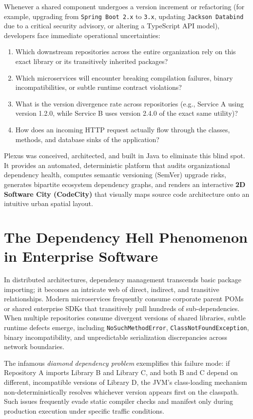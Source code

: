 \documentclass[11pt,a4paper,openany]{report}
\begin{document}
Whenever a shared component undergoes a version increment or refactoring (for example, upgrading from \texttt{Spring Boot 2.x} to \texttt{3.x}, updating \texttt{Jackson Databind} due to a critical security advisory, or altering a TypeScript API model), developers face immediate operational uncertainties:
\begin{enumerate}[label=\textbf{(\alph*)}, leftmargin=1.2cm]
    \item Which downstream repositories across the entire organization rely on this exact library or its transitively inherited packages?
    \item Which microservices will encounter breaking compilation failures, binary incompatibilities, or subtle runtime contract violations?
    \item What is the version divergence rate across repositories (e.g., Service A using version 1.2.0, while Service B uses version 2.4.0 of the exact same utility)?
    \item How does an incoming HTTP request actually flow through the classes, methods, and database sinks of the application?
\end{enumerate}

Plexus was conceived, architected, and built in Java to eliminate this blind spot. It provides an automated, deterministic platform that audits organizational dependency health, computes semantic versioning (SemVer) upgrade risks, generates bipartite ecosystem dependency graphs, and renders an interactive \textbf{2D Software City (CodeCity)} that visually maps source code architecture onto an intuitive urban spatial layout.

\section{The Dependency Hell Phenomenon in Enterprise Software}
In distributed architectures, dependency management transcends basic package importing; it becomes an intricate web of direct, indirect, and transitive relationships. Modern microservices frequently consume corporate parent POMs or shared enterprise SDKs that transitively pull hundreds of sub-dependencies. When multiple repositories consume divergent versions of shared libraries, subtle runtime defects emerge, including \texttt{NoSuchMethodError}, \texttt{ClassNotFoundException}, binary incompatibility, and unpredictable serialization discrepancies across network boundaries.

The infamous \textit{diamond dependency problem} exemplifies this failure mode: if Repository A imports Library B and Library C, and both B and C depend on different, incompatible versions of Library D, the JVM's class-loading mechanism non-deterministically resolves whichever version appears first on the classpath. Such issues frequently evade static compiler checks and manifest only during production execution under specific traffic conditions.
\end{document}
